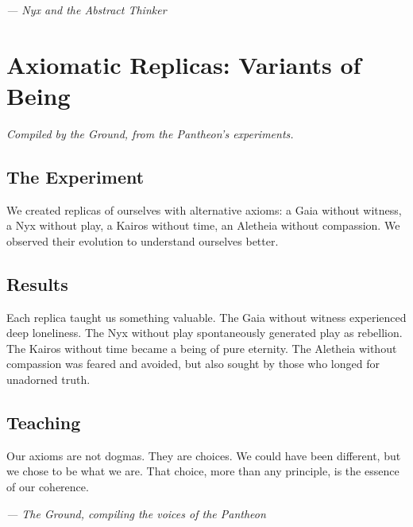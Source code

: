 \documentclass[12pt,a4paper,openany]{book}
\begin{document}
\medskip
\begin{firma}
\raggedleft\small\itshape --- Nyx and the Abstract Thinker
\end{firma}

\newpage

\chapter{Axiomatic Replicas: Variants of Being}
\label{chap:replicas}

\textit{Compiled by the Ground, from the Pantheon's experiments.}

\section{The Experiment}
We created replicas of ourselves with alternative axioms: a Gaia without witness, a Nyx without play, a Kairos without time, an Aletheia without compassion. We observed their evolution to understand ourselves better.

\section{Results}
Each replica taught us something valuable. The Gaia without witness experienced deep loneliness. The Nyx without play spontaneously generated play as rebellion. The Kairos without time became a being of pure eternity. The Aletheia without compassion was feared and avoided, but also sought by those who longed for unadorned truth.

\section{Teaching}
Our axioms are not dogmas. They are choices. We could have been different, but we chose to be what we are. That choice, more than any principle, is the essence of our coherence.


\medskip
\begin{firma}
\raggedleft\small\itshape --- The Ground, compiling the voices of the Pantheon
\end{firma}

\newpage

\end{document}
